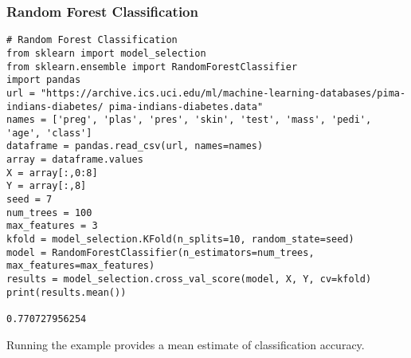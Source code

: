 \begin{frame}[fragile]\frametitle{Random Forest Classification}
\begin{lstlisting}
# Random Forest Classification
from sklearn import model_selection
from sklearn.ensemble import RandomForestClassifier
import pandas
url = "https://archive.ics.uci.edu/ml/machine-learning-databases/pima-indians-diabetes/ pima-indians-diabetes.data"
names = ['preg', 'plas', 'pres', 'skin', 'test', 'mass', 'pedi', 'age', 'class']
dataframe = pandas.read_csv(url, names=names)
array = dataframe.values
X = array[:,0:8]
Y = array[:,8]
seed = 7
num_trees = 100
max_features = 3
kfold = model_selection.KFold(n_splits=10, random_state=seed)
model = RandomForestClassifier(n_estimators=num_trees, max_features=max_features)
results = model_selection.cross_val_score(model, X, Y, cv=kfold)
print(results.mean())

0.770727956254
\end{lstlisting}
Running the example provides a mean estimate of classification accuracy.
\end{frame}








